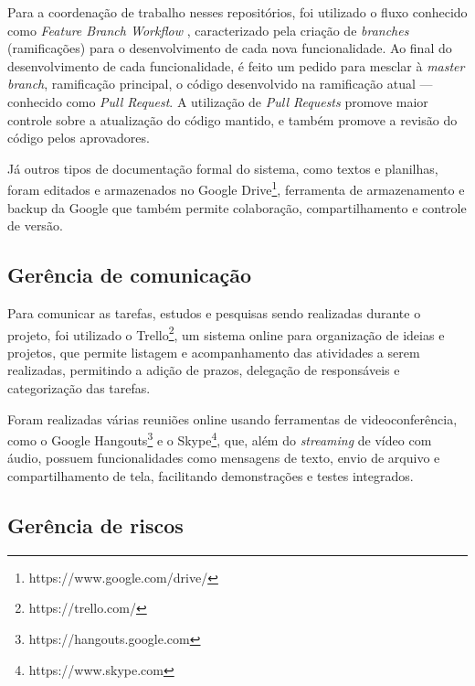Para a coordenação de trabalho nesses repositórios, foi utilizado o fluxo conhecido como \textit{Feature Branch Workflow} \cite{atlassian}, caracterizado pela criação de \textit{branches} (ramificações) para o desenvolvimento de cada nova funcionalidade. Ao final do desenvolvimento de cada funcionalidade, é feito um pedido para mesclar à \textit{master branch}, ramificação principal, o código desenvolvido na ramificação atual --- conhecido como \emph{Pull Request}. A utilização de \emph{Pull Requests} promove maior controle sobre a atualização do código mantido, e também promove a revisão do código pelos aprovadores. 

Já outros tipos de documentação formal do sistema, como textos e planilhas, foram editados e armazenados no Google Drive\footnote{https://www.google.com/drive/}, ferramenta de armazenamento e backup da Google que também permite colaboração, compartilhamento e controle de versão.


\subsection{Gerência de comunicação}

Para comunicar as tarefas, estudos e pesquisas sendo realizadas durante o projeto, foi utilizado o Trello\footnote{https://trello.com/}, um sistema online para organização de ideias e projetos, que permite listagem e acompanhamento das atividades a serem realizadas, permitindo a adição de prazos, delegação de responsáveis e categorização das tarefas.

Foram realizadas várias reuniões online usando ferramentas de videoconferência, como o Google Hangouts\footnote{https://hangouts.google.com} e o Skype\footnote{https://www.skype.com}, que, além do \emph{streaming} de vídeo com áudio, possuem funcionalidades como mensagens de texto, envio de arquivo e compartilhamento de tela, facilitando demonstrações e testes integrados.

\subsection{Gerência de riscos}

